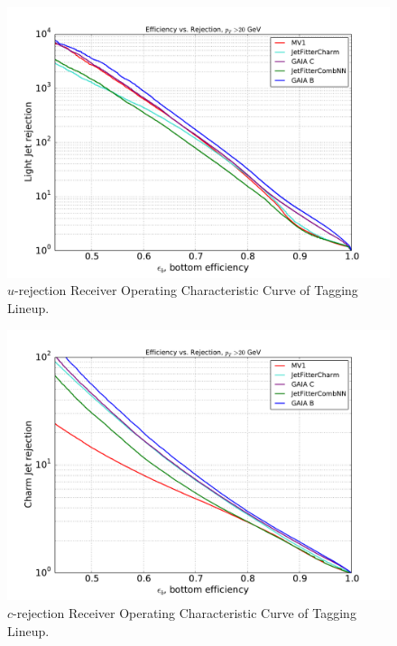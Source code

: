 \begin{figure}
\includegraphics[width=\textwidth]{figures/btag/u_rej_ROC.pdf}
\caption[The ATLAS detector]{$u$-rejection Receiver Operating Characteristic Curve of Tagging Lineup.
\label{fig:urejROC}}
\end{figure}

\begin{figure}
\includegraphics[width=\textwidth]{figures/btag/c_rej_ROC.pdf}
\caption[The ATLAS detector]{$c$-rejection Receiver Operating Characteristic Curve of Tagging Lineup.
\label{fig:crejROC}}
\end{figure}

